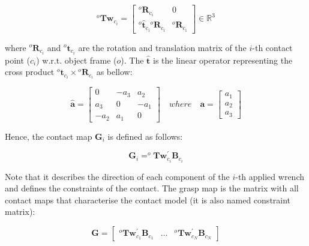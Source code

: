 \begin{equation}
^{o} \mathbf{Tw}_{c_i}=\left[\begin{array}{cc}
{^{o} \mathbf{R}_{\mathrm{c_i}}} & {0} \\
{^o \hat{\mathbf{t}}_{\mathrm{c_i}} {}^{o} \mathbf{R}_{\mathrm{c_i}}} & {^{o} \mathbf{R}_{\mathrm{c_i}}}
\end{array}\right]
\in \mathbb{R}^3
\end{equation}

\noindent
where $ ^o\mathbf{R}_{c_i}$ and $^o\mathbf{t}_{c_i}$ are the rotation and translation matrix of the $i$-th contact point ($c_i$) w.r.t. object frame ($o$). The $\mathbf{\hat{t}}$ is the linear operator representing the cross product $^o\mathbf{t}_{c_i} \times {{{}^o}\mathbf{R}}_{c_i}$ as bellow:

\begin{equation}
\widehat{\boldsymbol{a}}=\left[\begin{array}{ccc}
0 & -a_{3} & a_{2} \\
a_{3} & 0 & -a_{1} \\
-a_{2} & a_{1} & 0
\end{array}\right] \quad where \quad \boldsymbol{a} = \left[\begin{array}{c}
a_{1} \\
a_{2} \\
a_{3}
\end{array}\right]
\end{equation}


Hence, the contact map $\mathbf{G}_{i}$ is defined as follows:

\begin{equation}
\mathbf{G}_{i}=^{o} \mathbf{T} \mathbf{w}_{c_i}^{\prime} \mathbf{B}_{c_i}
\end{equation}

Note that it describes the direction of each component of the $i$-th applied wrench and defines the constraints of the contact. The grasp map is the matrix with all contact maps that characterise the contact model (it is also named constraint matrix):

\begin{equation}
\mathbf{G}=\left[\begin{array}{llll}
{{}^o \mathbf{T} \mathbf{w}_{c_1}^{\prime} \mathbf{B}_{c_1}} & {\dots} & {{}^{o} \mathbf{T} \mathbf{w}_{c_N}^{\prime} \mathbf{B}_{c_N}}
\end{array}\right]
\end{equation}

